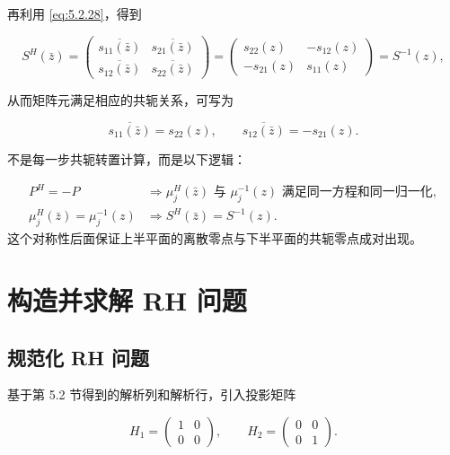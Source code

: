 \documentclass[
    lang=cn,
    scheme=chinese,
    mode=simple,
    device=normal,
    color=blue,
    math=cm,
    thmcnt=section,
    12pt,
    nowatermark
]{elegantbook}
\begin{document}
再利用 \eqref{eq:5.2.28}，得到

\[
    S^H(\bar z)
    =
    \begin{pmatrix}
        \overline{s_{11}(\bar z)} & \overline{s_{21}(\bar z)} \\
        \overline{s_{12}(\bar z)} & \overline{s_{22}(\bar z)}
    \end{pmatrix}
    =
    \begin{pmatrix}
        s_{22}(z)  & -s_{12}(z) \\
        -s_{21}(z) & s_{11}(z)
    \end{pmatrix}
    =
    S^{-1}(z),
\]

从而矩阵元满足相应的共轭关系，可写为

\begin{equation}
    \overline{s_{11}(\bar z)}=s_{22}(z),
    \qquad
    \overline{s_{12}(\bar z)}=-s_{21}(z).
    \tag{5.2.30}
    \label{eq:5.2.30}
\end{equation}

\begin{callout}[2.2 节真正要记住什么？]
    不是每一步共轭转置计算，而是以下逻辑：

    \[
        \begin{aligned}
            P^H=-P
             & \Longrightarrow
            \mu_j^H(\bar z)\text{ 与 }\mu_j^{-1}(z)
            \text{ 满足同一方程和同一归一化},
            \\
            \mu_j^H(\bar z)=\mu_j^{-1}(z)
             & \Longrightarrow
            S^H(\bar z)=S^{-1}(z).
        \end{aligned}
    \]
    这个对称性后面保证上半平面的离散零点与下半平面的共轭零点成对出现。
\end{callout}

\section{构造并求解 RH 问题}

\subsection{规范化 RH 问题}

基于第 5.2 节得到的解析列和解析行，引入投影矩阵

\begin{equation}
    H_1=
    \begin{pmatrix}
        1 & 0 \\
        0 & 0
    \end{pmatrix},
    \qquad
    H_2=
    \begin{pmatrix}
        0 & 0 \\
        0 & 1
    \end{pmatrix}.
    \tag{5.3.1}
    \label{eq:5.3.1}
\end{equation}
\end{document}
